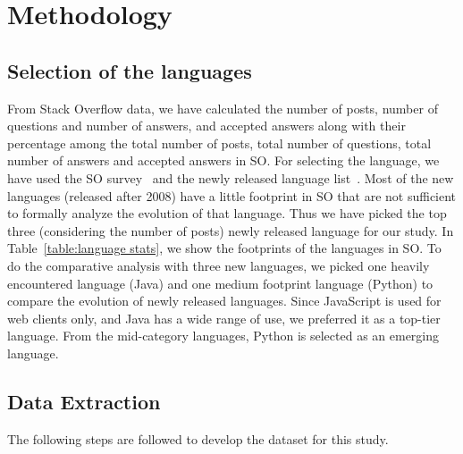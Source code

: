 \section{Methodology}
\label{sec:methodology}
\subsection{Selection of the languages}
From Stack Overflow data, we have calculated the number of posts, number of questions and number of answers, and accepted answers along with their percentage among the total number of posts, total number of questions, total number of answers and accepted answers in SO. For  selecting the language, we have used the SO survey~\citep{StackoverflowSurvey} and the newly released language list~\citep{wiki:Timeline}. Most of the new languages (released after 2008) have a little footprint in SO that are not sufficient to formally analyze the evolution of that language. Thus we have picked the top three (considering the number of posts) newly released language for our study. In Table~\ref{table:language stats}, we show the footprints of the languages in SO. To do the comparative analysis with three new languages, we picked one heavily encountered language (Java) and one medium footprint language (Python) to compare the evolution of newly released languages. Since JavaScript is used for web clients only, and Java has a wide range of use, we preferred it as a top-tier language. From the mid-category languages, Python is selected as an emerging language.


\subsection{Data Extraction}

The following steps are followed to develop the dataset for this study.

